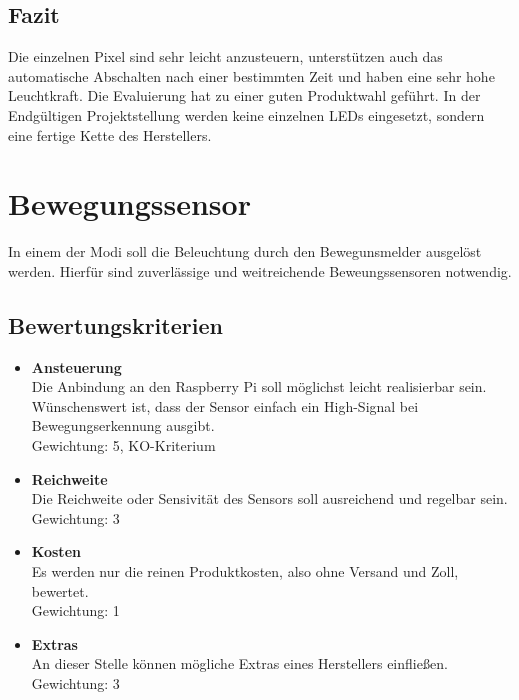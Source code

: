 \documentclass[12pt,a4paper]{scrreprt}
\begin{document}
\subsection{Fazit}
Die einzelnen Pixel sind sehr leicht anzusteuern, unterstützen auch das automatische Abschalten nach einer bestimmten Zeit und haben eine sehr hohe Leuchtkraft. Die Evaluierung hat zu einer guten Produktwahl geführt. In der Endgültigen Projektstellung werden keine einzelnen LEDs eingesetzt, sondern eine fertige Kette des Herstellers. 


\section{Bewegungssensor}
In einem der Modi soll die Beleuchtung durch den Bewegunsmelder ausgelöst werden. Hierfür sind zuverlässige und weitreichende Beweungssensoren notwendig.
\subsection{Bewertungskriterien}
\begin{itemize}
\item \textbf{Ansteuerung}\\
Die Anbindung an den Raspberry Pi soll möglichst leicht realisierbar sein. Wünschenswert ist, dass der Sensor einfach ein High-Signal bei Bewegungserkennung ausgibt. \\
Gewichtung: 5, KO-Kriterium
\item \textbf{Reichweite}\\
Die Reichweite oder Sensivität des Sensors soll ausreichend und regelbar sein.\\
Gewichtung: 3
\item \textbf{Kosten}\\
Es werden nur die reinen Produktkosten, also ohne Versand und Zoll, bewertet. \\
Gewichtung: 1
\item \textbf{Extras}\\
An dieser Stelle können mögliche Extras eines Herstellers einfließen.\\
Gewichtung: 3
\end{itemize}
\end{document}
